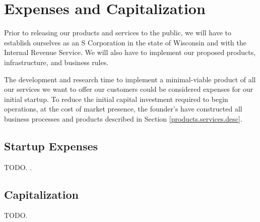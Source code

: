 {\let\cleardoublepage\relax \chapter{Expenses and Capitalization}}

Prior to releasing our products and services to the public, we will have to establish ourselves as an S Corporation in the state of Wisconsin and with the Internal Revenue Service. We will also have to implement our proposed products, infrastructure, and business rules.

The development and research time to implement a minimal-viable product of all our services we want to offer our customers could be considered expenses for our initial startup. To reduce the initial capital investment required to begin operations, at the cost of market presence, the founder's have constructed all business processes and products described in Section \ref{products.services.desc}.

\section{Startup Expenses}

TODO. \cite{wi.2018}.

\section{Capitalization}

TODO.
